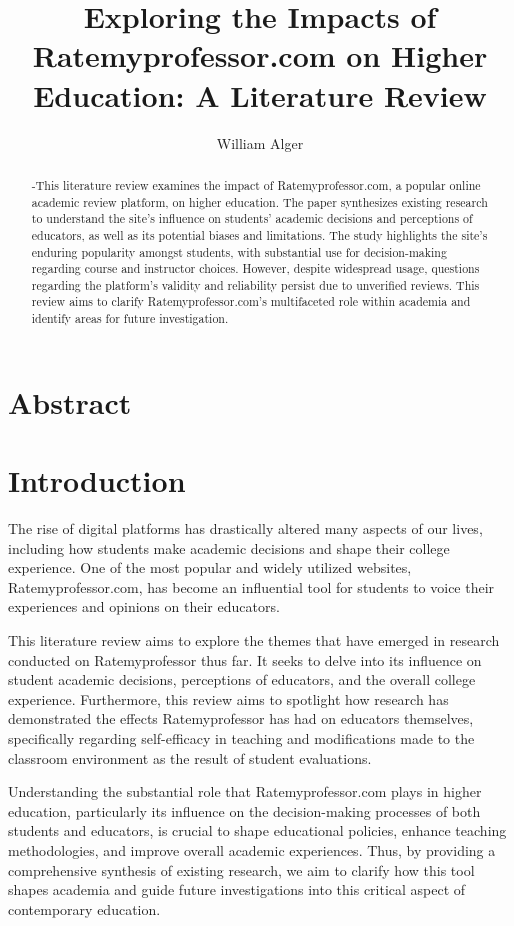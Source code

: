 \documentclass[doc, 12pt, twocolumn]{apa7}
\title{Exploring the Impacts of Ratemyprofessor.com on Higher Education: A Literature Review}
\author{William Alger}
\affiliation{Northern Kentucky University}
\begin{document}
\maketitle

\section{Abstract}
\begin{abstract}
-This literature review examines the impact of Ratemyprofessor.com, a popular online academic review platform, on higher education. The paper synthesizes existing research to understand the site's influence on students' academic decisions and perceptions of educators, as well as its potential biases and limitations. The study highlights the site's enduring popularity amongst students, with substantial use for decision-making regarding course and instructor choices. However, despite widespread usage, questions regarding the platform's validity and reliability persist due to unverified reviews. This review aims to clarify Ratemyprofessor.com's multifaceted role within academia and identify areas for future investigation.
\end{abstract}

\section{Introduction}
The rise of digital platforms has drastically altered many aspects of our lives, including how students make academic decisions and shape their college experience. One of the most popular and widely utilized websites, Ratemyprofessor.com, has become an influential tool for students to voice their experiences and opinions on their educators.

This literature review aims to explore the themes that have emerged in research conducted on Ratemyprofessor thus far. It seeks to delve into its influence on student academic decisions, perceptions of educators, and the overall college experience. Furthermore, this review aims to spotlight how research has demonstrated the effects Ratemyprofessor has had on educators themselves, specifically regarding self-efficacy in teaching and modifications made to the classroom environment as the result of student evaluations. 

Understanding the substantial role that Ratemyprofessor.com plays in higher education, particularly its influence on the decision-making processes of both students and educators, is crucial to shape educational policies, enhance teaching methodologies, and improve overall academic experiences. Thus, by providing a comprehensive synthesis of existing research, we aim to clarify how this tool shapes academia and guide future investigations into this critical aspect of contemporary education.
\end{document}
